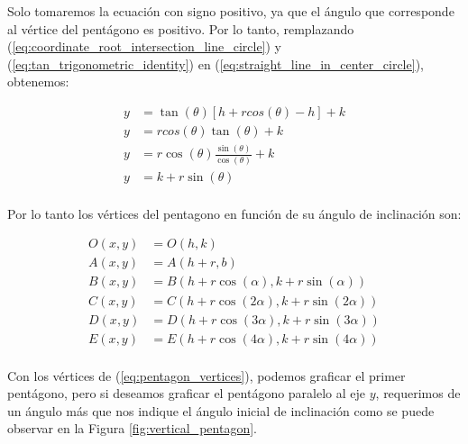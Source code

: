 \documentclass[oneside, a4paper]{article}
\begin{document}
            Solo tomaremos la ecuación con signo positivo, ya que el ángulo que corresponde al vértice del pentágono es positivo. Por lo tanto, remplazando (\ref{eq:coordinate_root_intersection_line_circle}) y (\ref{eq:tan_trigonometric_identity}) en (\ref{eq:straight_line_in_center_circle}), obtenemos:

            \begin{align*}
                y & = \tan(\theta)[h + rcos(\theta) - h] + k             \\
                y & = rcos(\theta)\tan(\theta) + k                       \\
                y & = r\cos(\theta)\frac{\sin(\theta)}{\cos(\theta)} + k \\
                y & = k + r\sin(\theta)                                  \\
            \end{align*}

            Por lo tanto los vértices del pentagono en función de su ángulo de inclinación son:

            \begin{equation}
                \begin{aligned}
                    O(x, y) & = O(h, k)                                   \\
                    A(x, y) & = A(h + r, b)                               \\
                    B(x, y) & = B(h + r\cos(\alpha), k + r\sin(\alpha))   \\
                    C(x, y) & = C(h + r\cos(2\alpha), k + r\sin(2\alpha)) \\
                    D(x, y) & = D(h + r\cos(3\alpha), k + r\sin(3\alpha)) \\
                    E(x, y) & = E(h + r\cos(4\alpha), k + r\sin(4\alpha)) \\
                \end{aligned}
                \label{eq:pentagon_vertices}
            \end{equation}

            Con los vértices de (\ref{eq:pentagon_vertices}), podemos graficar el primer pentágono, pero si deseamos graficar el pentágono paralelo al eje $y$, requerimos de un ángulo más que nos indique el ángulo inicial de inclinación como se puede observar en la Figura \ref{fig:vertical_pentagon}.
\end{document}
